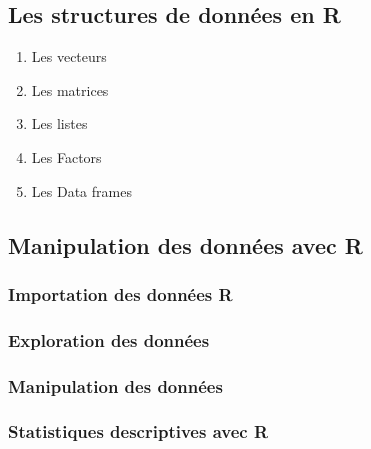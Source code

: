 \documentclass[
]{article}
\providecommand{\tightlist}{%
  \setlength{\itemsep}{0pt}\setlength{\parskip}{0pt}}
\begin{document}
\hypertarget{les-structures-de-donnuxe9es-en-r}{%
\subsection{Les structures de données en
R}\label{les-structures-de-donnuxe9es-en-r}}

\begin{enumerate}
\def\labelenumi{\arabic{enumi}.}
\tightlist
\item
  Les vecteurs\\
\item
  Les matrices\\
\item
  Les listes\\
\item
  Les Factors
\item
  Les Data frames
\end{enumerate}

\hypertarget{manipulation-des-donnuxe9es-avec-r}{%
\subsection{Manipulation des données avec
R}\label{manipulation-des-donnuxe9es-avec-r}}

\hypertarget{importation-des-donnuxe9es-r}{%
\subsubsection{Importation des données
R}\label{importation-des-donnuxe9es-r}}

\hypertarget{exploration-des-donnuxe9es}{%
\subsubsection{Exploration des
données}\label{exploration-des-donnuxe9es}}

\hypertarget{manipulation-des-donnuxe9es}{%
\subsubsection{Manipulation des
données}\label{manipulation-des-donnuxe9es}}

\hypertarget{statistiques-descriptives-avec-r}{%
\subsubsection{Statistiques descriptives avec
R}\label{statistiques-descriptives-avec-r}}
\end{document}
